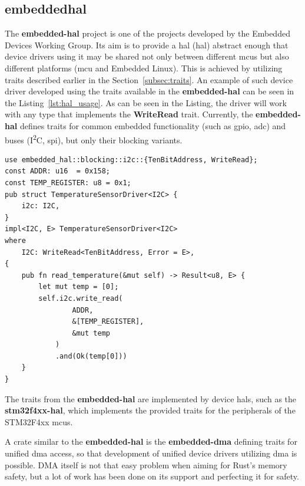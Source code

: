 \subsection{embedded\textendash hal}
\label{subsec:embedded_hal}
The \textbf{embedded-hal} project\cite{rust_embedded_devices_wg_rust-embeddedembedded-hal_2021} is one of the projects developed by the Embedded Devices Working Group.
Its aim is to provide a \acs{hal} (\acl{hal}) abstract enough that device drivers using it may be shared not only between different \acs{mcu}s but also different platforms (\acs{mcu} and Embedded Linux).
This is achieved by utilizing traits described earlier in the Section~\ref{subsec:traits}.
An example of such device driver developed using the traits available in the \textbf{embedded-hal} can be seen in the Listing~\ref{lst:hal_usage}\cite{rust_embedded_devices_wg_rust-embeddedembedded-hal_2021}.
As can be seen in the Listing, the driver will work with any type that implements the \textbf{WriteRead} trait.
Currently, the \textbf{embedded-hal} defines traits for common embedded functionality (such as \acs{gpio}, \acs{adc}) and buses (I\textsuperscript{2}C, \acs{spi}), but only their blocking variants.

\newpage
\begin{lstlisting}[caption={Example of an device driver utilizing embedded\textendash hal traits.},label=lst:hal_usage]
use embedded_hal::blocking::i2c::{TenBitAddress, WriteRead};
const ADDR: u16  = 0x158;
const TEMP_REGISTER: u8 = 0x1;
pub struct TemperatureSensorDriver<I2C> {
    i2c: I2C,
}
impl<I2C, E> TemperatureSensorDriver<I2C>
where
    I2C: WriteRead<TenBitAddress, Error = E>,
{
    pub fn read_temperature(&mut self) -> Result<u8, E> {
        let mut temp = [0];
        self.i2c.write_read(
                ADDR,
                &[TEMP_REGISTER],
                &mut temp
            )
            .and(Ok(temp[0]))
    }
}
\end{lstlisting}

The traits from the \textbf{embedded-hal} are implemented by device \acs{hal}s, such as the \textbf{stm32f4xx-hal}\cite{noauthor_stm32-rsstm32f4xx-hal_2021}, which implements the provided traits for the peripherals of the STM32F4xx \acs{mcu}s.

A crate similar to the \textbf{embedded-hal} is the \textbf{embedded-dma} defining traits for unified \acs{dma} access, so that development of unified device drivers utilizing \acs{dma} is possible.
DMA itself is not that easy problem when aiming for Rust's memory safety\cite{aparicio_memory_nodate}, but a lot of work has been done on its support and perfecting it for safety.

